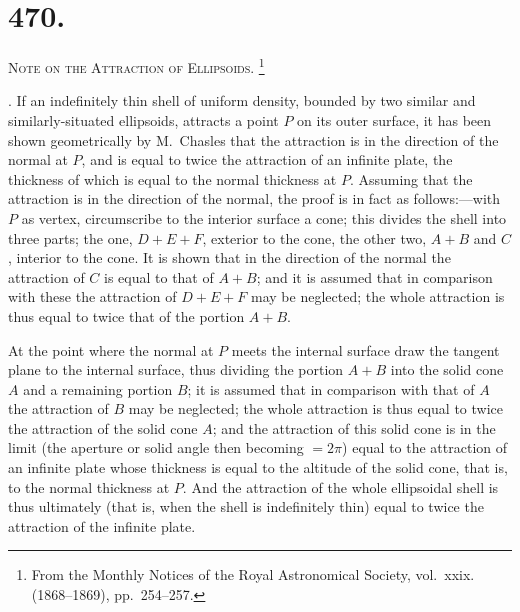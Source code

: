 \documentclass[11pt,a4paper]{article}
\theoremstyle{definition}
\begin{document}
\newpage

\section*{470.}
\markboth{NOTE ON THE ATTRACTION OF ELLIPSOIDS.}{470]}

\noindent\textsc{Note on the Attraction of Ellipsoids.}%
\footnote{From the Monthly Notices of the Royal Astronomical Society, vol.~xxix. (1868--1869), pp.~254--257.}

\smallskip

. If an indefinitely thin shell of uniform density, bounded by two similar and
similarly-situated ellipsoids, attracts a point $P$ on its outer surface, it has been shown
geometrically by M.~Chasles that the attraction is in the direction of the normal at
$P$, and is equal to twice the attraction of an infinite plate, the thickness of which is
equal to the normal thickness at $P$. Assuming that the attraction is in the direction
of the normal, the proof is in fact as follows:---with $P$ as vertex, circumscribe to the
interior surface a cone; this divides the shell into three parts; the one, $D+E+F$,
exterior to the cone, the other two, $A+B$ and $C$, interior to the cone. It is shown
that in the direction of the normal the attraction of $C$ is equal to that of $A+B$;
and it is assumed that in comparison with these the attraction of $D+E+F$ may be
neglected; the whole attraction is thus equal to twice that of the portion $A+B$.

At the point where the normal at $P$ meets the internal surface draw the tangent plane
to the internal surface, thus dividing the portion $A+B$ into the solid cone $A$ and
a remaining portion $B$; it is assumed that in comparison with that of $A$ the attraction
of $B$ may be neglected; the whole attraction is thus equal to twice the attraction of
the solid cone $A$; and the attraction of this solid cone is in the limit (the aperture
or solid angle then becoming $=2\pi$) equal to the attraction of an infinite plate whose
thickness is equal to the altitude of the solid cone, that is, to the normal thickness
at $P$. And the attraction of the whole ellipsoidal shell is thus ultimately (that is,
when the shell is indefinitely thin) equal to twice the attraction of the infinite plate.
\end{document}
